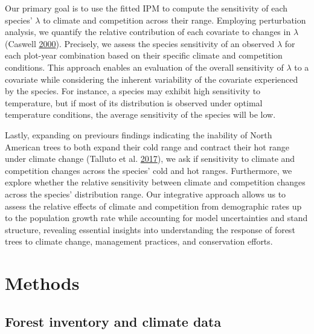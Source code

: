 \documentclass[12pt]{article}
\begin{document}
Our primary goal is to use the fitted IPM to compute the sensitivity of
each species' \(\lambda\) to climate and competition across their range.
Employing perturbation analysis, we quantify the relative contribution
of each covariate to changes in \(\lambda\) (Caswell
\protect\hyperlink{ref-Caswell2000}{2000}). Precisely, we assess the
species sensitivity of an observed \(\lambda\) for each plot-year
combination based on their specific climate and competition conditions.
This approach enables an evaluation of the overall sensitivity of
\(\lambda\) to a covariate while considering the inherent variability of
the covariate experienced by the species. For instance, a species may
exhibit high sensitivity to temperature, but if most of its distribution
is observed under optimal temperature conditions, the average
sensitivity of the species will be low.

Lastly, expanding on previours findings indicating the inability of
North American trees to both expand their cold range and contract their
hot range under climate change (Talluto et al.
\protect\hyperlink{ref-Talluto2017}{2017}), we ask if sensitivity to
climate and competition changes across the species' cold and hot ranges.
Furthermore, we explore whether the relative sensitivity between climate
and competition changes across the species' distribution range. Our
integrative approach allows us to assess the relative effects of climate
and competition from demographic rates up to the population growth rate
while accounting for model uncertainties and stand structure, revealing
essential insights into understanding the response of forest trees to
climate change, management practices, and conservation efforts.

\hypertarget{methods}{%
\section{Methods}\label{methods}}

\hypertarget{forest-inventory-and-climate-data}{%
\subsection{Forest inventory and climate
data}\label{forest-inventory-and-climate-data}}
\end{document}
